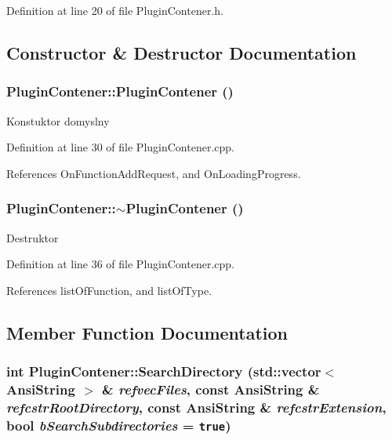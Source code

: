 Definition at line 20 of file PluginContener.h.

\subsection{Constructor \& Destructor Documentation}
\hypertarget{classPluginContener_add74dce0031e59011ff0e147eb3be98}{
\subsubsection[PluginContener]{\setlength{\rightskip}{0pt plus 5cm}PluginContener::PluginContener ()}}
\label{classPluginContener_add74dce0031e59011ff0e147eb3be98}


Konstuktor domyslny 

Definition at line 30 of file PluginContener.cpp.

References OnFunctionAddRequest, and OnLoadingProgress.\hypertarget{classPluginContener_5be9154e3104ea30ebc2abe27ed740a3}{
\subsubsection[$\sim$PluginContener]{\setlength{\rightskip}{0pt plus 5cm}PluginContener::$\sim$PluginContener ()}}
\label{classPluginContener_5be9154e3104ea30ebc2abe27ed740a3}


Destruktor 

Definition at line 36 of file PluginContener.cpp.

References listOfFunction, and listOfType.

\subsection{Member Function Documentation}
\hypertarget{classPluginContener_0ee8809bd8743d5eb0c233185bee1c6b}{
\subsubsection[SearchDirectory]{\setlength{\rightskip}{0pt plus 5cm}int PluginContener::SearchDirectory (std::vector$<$ AnsiString $>$ \& {\em refvecFiles}, \/  const AnsiString \& {\em refcstrRootDirectory}, \/  const AnsiString \& {\em refcstrExtension}, \/  bool {\em bSearchSubdirectories} = {\tt true})}}
\label{classPluginContener_0ee8809bd8743d5eb0c233185bee1c6b}




